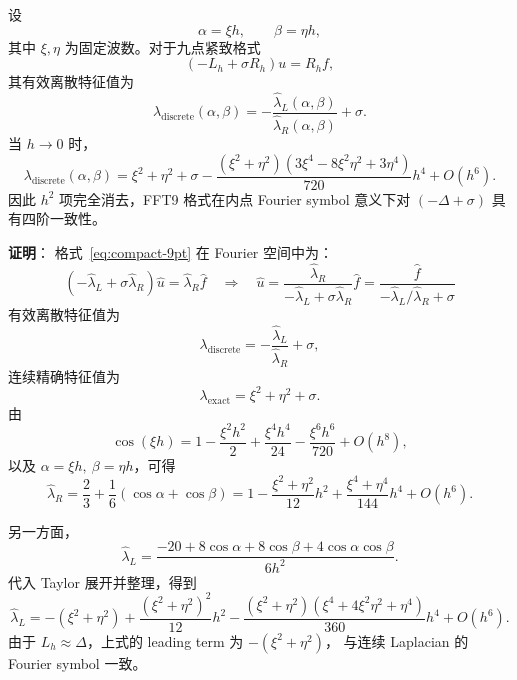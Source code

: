 \begin{theorem}
  \label{thm:4th_order}
  设
  \[
    \alpha=\xi h,\qquad \beta=\eta h,
  \]
  其中 $\xi,\eta$ 为固定波数。对于九点紧致格式
  \[
    (-L_h+\sigma R_h)u=R_hf,
  \]
  其有效离散特征值为
  \begin{equation}
    \lambda_{\mathrm{discrete}}(\alpha,\beta)
    =
    -\frac{\hat{\lambda}_L(\alpha,\beta)}
    {\hat{\lambda}_R(\alpha,\beta)}
    +\sigma.
  \end{equation}
  当 $h\to0$ 时，
  \begin{equation}
    \lambda_{\mathrm{discrete}}(\alpha,\beta)
    =
    \xi^2+\eta^2+\sigma
    -
    \frac{(\xi^2+\eta^2)(3\xi^4-8\xi^2\eta^2+3\eta^4)}{720}h^4
    +O(h^6).
    \label{eq:fft9_symbol_4th}
  \end{equation}
  因此 $h^2$ 项完全消去，FFT9 格式在内点 Fourier symbol 意义下对
  $(-\Delta+\sigma)$ 具有四阶一致性。

  \textbf{证明}：
  格式~\eqref{eq:compact-9pt} 在 Fourier 空间中为：
  \begin{equation}
    (-\hat{\lambda}_L + \sigma\hat{\lambda}_R)\hat{u} = \hat{\lambda}_R\hat{f}
    \quad \Longrightarrow \quad
    \hat{u} = \frac{\hat{\lambda}_R}{-\hat{\lambda}_L + \sigma\hat{\lambda}_R}\hat{f}
    = \frac{\hat{f}}{-\hat{\lambda}_L/\hat{\lambda}_R + \sigma}
  \end{equation}
  有效离散特征值为
  \[
    \lambda_{\mathrm{discrete}}
    =
    -\frac{\hat{\lambda}_L}{\hat{\lambda}_R}+\sigma,
  \]
  连续精确特征值为
  \[
    \lambda_{\mathrm{exact}}=\xi^2+\eta^2+\sigma.
  \]
  由
  \[
    \cos(\xi h)
    =
    1-\frac{\xi^2h^2}{2}
    +\frac{\xi^4h^4}{24}
    -\frac{\xi^6h^6}{720}
    +O(h^8),
  \]
  以及 $\alpha=\xi h,\ \beta=\eta h$，可得
  \begin{equation}
    \hat{\lambda}_R
    =
    \frac{2}{3}
    +
    \frac{1}{6}(\cos\alpha+\cos\beta)
    =
    1-\frac{\xi^2+\eta^2}{12}h^2
    +
    \frac{\xi^4+\eta^4}{144}h^4
    +
    O(h^6).
    \label{eq:lam_R_expand}
  \end{equation}

  另一方面，
  \[
    \hat{\lambda}_L
    =
    \frac{-20+8\cos\alpha+8\cos\beta+4\cos\alpha\cos\beta}{6h^2}.
  \]
  代入 Taylor 展开并整理，得到
  \begin{equation}
    \hat{\lambda}_L
    =
    -(\xi^2+\eta^2)
    +
    \frac{(\xi^2+\eta^2)^2}{12}h^2
    -
    \frac{(\xi^2+\eta^2)(\xi^4+4\xi^2\eta^2+\eta^4)}{360}h^4
    +
    O(h^6).
    \label{eq:lam_L_expand}
  \end{equation}
  由于 $L_h\approx\Delta$，上式的 leading term 为 $-(\xi^2+\eta^2)$，
  与连续 Laplacian 的 Fourier symbol 一致。


\end{theorem}
